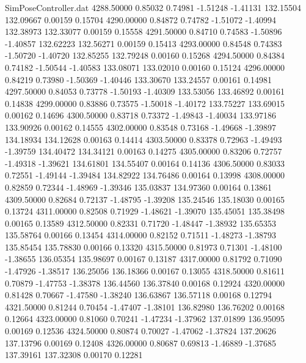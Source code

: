 \begin{filecontents}{SimPoseController.dat}
4288.50000    0.85032    0.74981    -1.51248   -1.41131  132.15504  132.09667    0.00159    0.15704
4290.00000    0.84872    0.74782    -1.51072   -1.40994  132.38973  132.33077    0.00159    0.15558
4291.50000    0.84710    0.74583    -1.50896   -1.40857  132.62223  132.56271    0.00159    0.15413
4293.00000    0.84548    0.74383    -1.50720   -1.40720  132.85255  132.79248    0.00160    0.15268
4294.50000    0.84384    0.74182    -1.50544   -1.40583  133.08071  133.02010    0.00160    0.15124
4296.00000    0.84219    0.73980    -1.50369   -1.40446  133.30670  133.24557    0.00161    0.14981
4297.50000    0.84053    0.73778    -1.50193   -1.40309  133.53056  133.46892    0.00161    0.14838
4299.00000    0.83886    0.73575    -1.50018   -1.40172  133.75227  133.69015    0.00162    0.14696
4300.50000    0.83718    0.73372    -1.49843   -1.40034  133.97186  133.90926    0.00162    0.14555
4302.00000    0.83548    0.73168    -1.49668   -1.39897  134.18934  134.12628    0.00163    0.14414
4303.50000    0.83378    0.72963    -1.49493   -1.39759  134.40472  134.34121    0.00163    0.14275
4305.00000    0.83206    0.72757    -1.49318   -1.39621  134.61801  134.55407    0.00164    0.14136
4306.50000    0.83033    0.72551    -1.49144   -1.39484  134.82922  134.76486    0.00164    0.13998
4308.00000    0.82859    0.72344    -1.48969   -1.39346  135.03837  134.97360    0.00164    0.13861
4309.50000    0.82684    0.72137    -1.48795   -1.39208  135.24546  135.18030    0.00165    0.13724
4311.00000    0.82508    0.71929    -1.48621   -1.39070  135.45051  135.38498    0.00165    0.13589
4312.50000    0.82331    0.71720    -1.48447   -1.38932  135.65353  135.58764    0.00166    0.13454
4314.00000    0.82152    0.71511    -1.48273   -1.38793  135.85454  135.78830    0.00166    0.13320
4315.50000    0.81973    0.71301    -1.48100   -1.38655  136.05354  135.98697    0.00167    0.13187
4317.00000    0.81792    0.71090    -1.47926   -1.38517  136.25056  136.18366    0.00167    0.13055
4318.50000    0.81611    0.70879    -1.47753   -1.38378  136.44560  136.37840    0.00168    0.12924
4320.00000    0.81428    0.70667    -1.47580   -1.38240  136.63867  136.57118    0.00168    0.12794
4321.50000    0.81244    0.70454    -1.47407   -1.38101  136.82980  136.76202    0.00168    0.12664
4323.00000    0.81060    0.70241    -1.47234   -1.37962  137.01899  136.95095    0.00169    0.12536
4324.50000    0.80874    0.70027    -1.47062   -1.37824  137.20626  137.13796    0.00169    0.12408
4326.00000    0.80687    0.69813    -1.46889   -1.37685  137.39161  137.32308    0.00170    0.12281

\end{filecontents}
